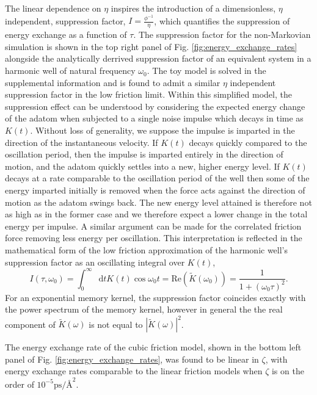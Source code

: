 \documentclass[7pt]{article}
\newcommand*{\diff}{\mathop{}\!\mathrm{d}}
\newcommand{\uzeta}{\si{\pico\second\per\angstrom\squared}}
\begin{document}
The linear dependence on $\eta$ inspires the introduction of a dimensionless, $\eta$ independent, suppression factor, $I = \frac{\phi^{-1}}{\eta}$, which quantifies the suppression of energy exchange as a function of $\tau$. The suppression factor for the non-Markovian simulation is shown in the top right panel of Fig. \ref{fig:energy_exchange_rates} alongside the analytically derrived suppression factor of an equivalent system in a harmonic well of natural frequency $\omega_0$. The toy model is solved in the supplemental information and is found to admit a similar $\eta$ independent suppression factor in the low friction limit. Within this simplified model, the suppression effect can be understood by considering the expected energy change of the adatom when subjected to a single noise impulse which decays in time as $K(t)$. Without loss of generality, we suppose the impulse is imparted in the direction of the instantaneous velocity. If $K(t)$ decays quickly compared to the oscillation period, then the impulse is imparted entirely in the direction of motion, and the adatom quickly settles into a new, higher energy level. If $K(t)$ decays at a rate comparable to the oscillation period of the well then some of the energy imparted initially is removed when the force acts against the direction of motion as the adatom swings back. The new energy level attained is therefore not as high as in the former case and we therefore expect a lower change in the total energy per impulse. A similar argument can be made for the correlated friction force removing less energy per oscillation. This interpretation is reflected in the mathematical form of the low friction approximation of the harmonic well's suppression factor as an oscillating integral over $K(t)$,
\begin{equation}
	I(\tau, \omega_0) = \int_0^{\infty}\diff{t}K(t)\cos{\omega_0t} = \mathrm{Re}\left(\tilde{K}(\omega_0)\right) = \frac{1}{1+\left(\omega_0\tau\right)^2}.
	\label{eq:suppression_factor}
\end{equation}
For an exponential memory kernel, the suppression factor coincides exactly with the power spectrum of the memory kernel, however in general 
the the real component of $\tilde{K}(\omega)$ is not equal to $\left|\tilde{K}(\omega)\right|^2$. 

The energy exchange rate of the cubic friction model, shown in the bottom left panel of Fig. \ref{fig:energy_exchange_rates}, was found to be linear in $\zeta$, with energy exchange rates comparable to the linear friction models when $\zeta$ is on the order of $10^{-5}\uzeta$.
\end{document}
